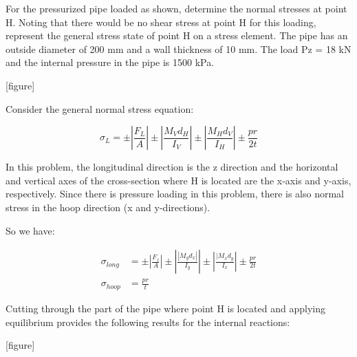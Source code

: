 \documentclass[
  letterpaper,
  DIV=11,
  numbers=noendperiod]{scrreprt}
\theoremstyle{definition}
\theoremstyle{remark}
\begin{document}
\begin{tcolorbox}[enhanced jigsaw, leftrule=.75mm, colbacktitle=quarto-callout-tip-color!10!white, breakable, opacityback=0, colback=white, titlerule=0mm, toprule=.15mm, colframe=quarto-callout-tip-color-frame, coltitle=black, title={Example 14.4}, toptitle=1mm, bottomrule=.15mm, rightrule=.15mm, left=2mm, arc=.35mm, opacitybacktitle=0.6, bottomtitle=1mm]

For the pressurized pipe loaded as shown, determine the normal stresses
at point H. Noting that there would be no shear stress at point H for
this loading, represent the general stress state of point H on a stress
element. The pipe has an outside diameter of 200 mm and a wall thickness
of 10 mm. The load Pz = 18 kN and the internal pressure in the pipe is
1500 kPa.

{[}figure{]}

\begin{tcolorbox}[enhanced jigsaw, leftrule=.75mm, colbacktitle=quarto-callout-tip-color!10!white, breakable, opacityback=0, colback=white, titlerule=0mm, toprule=.15mm, colframe=quarto-callout-tip-color-frame, coltitle=black, title={Solution}, toptitle=1mm, bottomrule=.15mm, rightrule=.15mm, left=2mm, arc=.35mm, opacitybacktitle=0.6, bottomtitle=1mm]

Consider the general normal stress equation:

\[
\sigma_L= \pm\left|\frac{F_L}{A}\right| \pm\left|\frac{M_V d_H}{I_V}\right| \pm\left|\frac{M_H d_V}{I_H}\right| \pm \frac{p r}{2 t}
\]

In this problem, the longitudinal direction is the z direction and the
horizontal and vertical axes of the cross-section where H is located are
the x-axis and y-axis, respectively. Since there is pressure loading in
this problem, there is also normal stress in the hoop direction (x and
y-directions).

So we have:

\[
\begin{aligned}
\sigma_{long} & = \pm\left|\frac{F_z}{A}\right| \pm\left|\frac{\left|M_y d_x\right|}{I_y}\right| \pm\left|\frac{\mid M_x d_y}{I_x}\right| \pm \frac{p r}{2 t} \\
\sigma_{hoop} & =\frac{p r}{t}
\end{aligned}
\]

Cutting through the part of the pipe where point H is located and
applying equilibrium provides the following results for the internal
reactions:

{[}figure{]}


\end{tcolorbox}
\end{tcolorbox}
\end{document}
